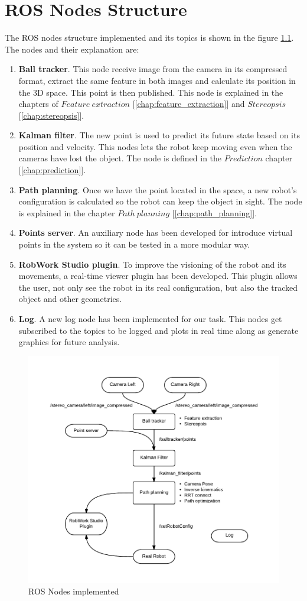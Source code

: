 \chapter{ROS Nodes Structure} %
\label{chap:ros_nodes_structure}
The ROS nodes structure implemented and its topics is shown in the figure \ref{fig:ros_nodes}. The nodes and their explanation are:
\begin{enumerate}
	\item \textbf{Ball tracker}. This node receive image from the camera in its compressed format, extract the same feature in both images and calculate its position in the 3D space. This point is then published. This node is explained in the chapters of $Feature\ extraction$ [\ref{chap:feature_extraction}] and $Stereopsis$ [\ref{chap:stereopsis}].
	\item \textbf{Kalman filter}. The new point is used to predict its future state based on its position and velocity. This nodes lets the robot keep moving even when the cameras have lost the object. The node is defined in the $Prediction$ chapter [\ref{chap:prediction}].
	\item \textbf{Path planning}. Once we have the point located in the space, a new robot's configuration is calculated so the robot can keep the object in sight. The node is explained in the chapter $Path\ planning$ [\ref{chap:path_planning}].
	\item \textbf{Points server}. An auxiliary node has been developed for introduce virtual points in the system so it can be tested in a more modular way.
	\item \textbf{RobWork Studio plugin}. To improve the visioning of the robot and its movements, a real-time viewer plugin has been developed. This plugin allows the user, not only see the robot in its real configuration, but also the tracked object and other geometries.
	\item \textbf{Log}. A new log node has been implemented for our task. This nodes get subscribed to the topics to be logged and plots in real time along as generate graphics for future analysis.
\end{enumerate}

\begin{figure}[!ht]
	\centering
	\includegraphics[width=\textwidth]{figures/ros_nodes}
	\caption{ROS Nodes implemented}
	\label{fig:ros_nodes}
\end{figure}
